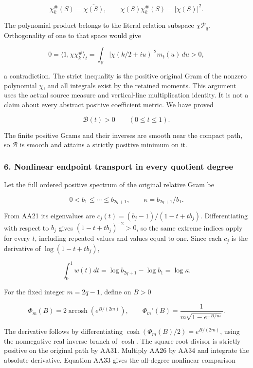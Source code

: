 \documentclass{article}
\begin{document}
\[
\chi_k^{\#}(S)=\overline{\chi(S)},\qquad
\chi(S)\chi_k^{\#}(S)=|\chi(S)|^2.
\tag{AA29}
\]

The polynomial product belongs to the literal relation subspace \(\chi\mathcal P_q\). Orthogonality of one to that space would give

\[
0=\langle1,\chi\chi_k^{\#}\rangle_t
=\int_{\mathbb R}|\chi(k/2+iu)|^2m_t(u)\,du>0,
\tag{AA30}
\]

a contradiction. The strict inequality is the positive original Gram of the nonzero polynomial \(\chi\), and all integrals exist by the retained moments. This argument uses the actual source measure and vertical-line multiplication identity. It is not a claim about every abstract positive coefficient metric. We have proved

\[
\mathcal B(t)>0\qquad(0\le t\le1).
\tag{AA31}
\]

The finite positive Grams and their inverses are smooth near the compact path, so \(\mathcal B\) is smooth and attains a strictly positive minimum on it.

\subsubsection{6. Nonlinear endpoint transport in every quotient degree}\label{endpoint-all_degree_angle_review--nonlinear-endpoint-transport-in-every-quotient-degree}

Let the full ordered positive spectrum of the original relative Gram be

\[
0<b_1\le\cdots\le b_{2q+1},\qquad
\kappa=b_{2q+1}/b_1.
\tag{AA32}
\]

From AA21 its eigenvalues are \(c_j(t)=(b_j-1)/(1-t+tb_j)\). Differentiating with respect to \(b_j\) gives \((1-t+tb_j)^{-2}>0\), so the same extreme indices apply for every \(t\), including repeated values and values equal to one. Since each \(c_j\) is the derivative of \(\log(1-t+tb_j)\),

\[
\int_0^1 w(t)dt=\log b_{2q+1}-\log b_1=\log\kappa.
\tag{AA33}
\]

For the fixed integer \(m=2q-1\), define on \(B>0\)

\[
\Phi_m(B)=2\operatorname{arcosh}(e^{B/(2m)}),\qquad
\Phi_m'(B)=\frac1{m\sqrt{1-e^{-B/m}}}.
\tag{AA34}
\]

The derivative follows by differentiating \(\cosh(\Phi_m(B)/2)=e^{B/(2m)}\), using the nonnegative real inverse branch of \(\cosh\). The square root divisor is strictly positive on the original path by AA31. Multiply AA26 by AA34 and integrate the absolute derivative. Equation AA33 gives the all-degree nonlinear comparison
\end{document}
